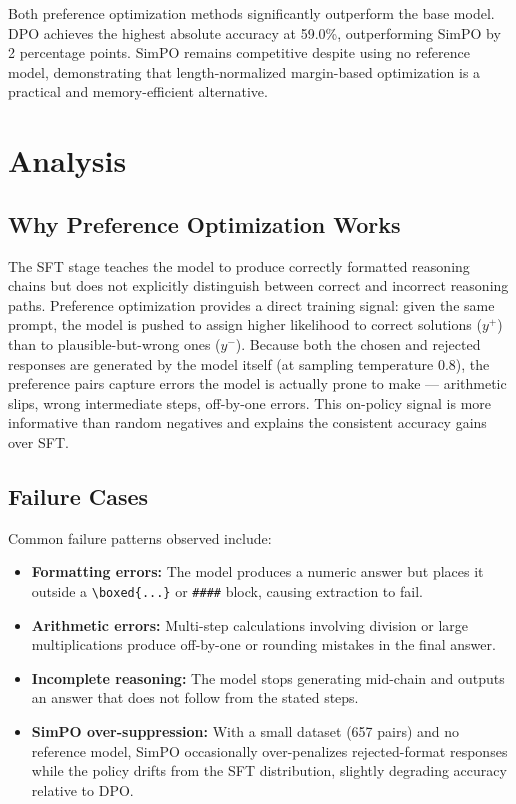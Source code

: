 \documentclass{article}
\begin{document}
Both preference optimization methods significantly outperform the base model. DPO achieves the highest absolute accuracy at 59.0\%, outperforming SimPO by 2 percentage points. SimPO remains competitive despite using no reference model, demonstrating that length-normalized margin-based optimization is a practical and memory-efficient alternative.

\section{Analysis}

\subsection{Why Preference Optimization Works}

The SFT stage teaches the model to produce correctly formatted reasoning chains but does not explicitly distinguish between correct and incorrect reasoning paths. Preference optimization provides a direct training signal: given the same prompt, the model is pushed to assign higher likelihood to correct solutions ($y^+$) than to plausible-but-wrong ones ($y^-$). Because both the chosen and rejected responses are generated by the model itself (at sampling temperature 0.8), the preference pairs capture errors the model is actually prone to make — arithmetic slips, wrong intermediate steps, off-by-one errors. This on-policy signal is more informative than random negatives and explains the consistent accuracy gains over SFT.

\subsection{Failure Cases}

Common failure patterns observed include:

\begin{itemize}
    \item \textbf{Formatting errors:} The model produces a numeric answer but places it outside a \texttt{\textbackslash boxed\{...\}} or \texttt{\#\#\#\#} block, causing extraction to fail.
    \item \textbf{Arithmetic errors:} Multi-step calculations involving division or large multiplications produce off-by-one or rounding mistakes in the final answer.
    \item \textbf{Incomplete reasoning:} The model stops generating mid-chain and outputs an answer that does not follow from the stated steps.
    \item \textbf{SimPO over-suppression:} With a small dataset (657 pairs) and no reference model, SimPO occasionally over-penalizes rejected-format responses while the policy drifts from the SFT distribution, slightly degrading accuracy relative to DPO.
\end{itemize}
\end{document}
